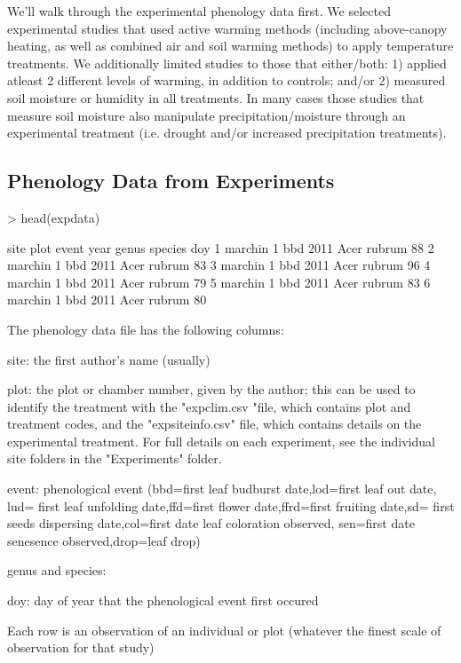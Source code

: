 \documentclass{article}
\begin{document}
We'll walk through the experimental phenology data first. We selected experimental studies that used active warming methods (including above-canopy heating, as well as combined air and soil warming methods) to apply temperature treatments. We additionally limited studies to those that either/both: 1) applied atleast 2 different levels of warming, in addition to controls; and/or 2) measured soil moisture or humidity in all treatments. In many cases those studies that measure soil moisture also manipulate precipitation/moisture through an experimental treatment (i.e. drought and/or increased precipitation treatments).
\subsection{Phenology Data from Experiments}

\begin{Schunk}
\begin{Sinput}
> head(expdata)
\end{Sinput}
\begin{Soutput}
     site plot event year genus species doy
1 marchin    1   bbd 2011  Acer  rubrum  88
2 marchin    1   bbd 2011  Acer  rubrum  83
3 marchin    1   bbd 2011  Acer  rubrum  96
4 marchin    1   bbd 2011  Acer  rubrum  79
5 marchin    1   bbd 2011  Acer  rubrum  83
6 marchin    1   bbd 2011  Acer  rubrum  80
\end{Soutput}
\end{Schunk}
The phenology data file has the following columns:

site: the first author's name (usually)

plot: the plot or chamber number, given by the author; this can be used to identify the treatment with the "expclim.csv "file, which contains plot and treatment codes, and the "expsiteinfo.csv" file, which contains details on the experimental treatment. For full details on each experiment, see the individual site folders in the "Experiments" folder.

event: phenological event (bbd=first leaf budburst date,lod=first leaf out date, lud= first leaf unfolding date,ffd=first flower date,ffrd=first fruiting date,sd= first seeds dispersing date,col=first date leaf coloration observed, sen=first date senesence observed,drop=leaf drop)

genus and species: 

doy: day of year that the phenological event first occured

Each row is an observation of an individual or plot (whatever the finest scale of observation for that study)
\end{document}
